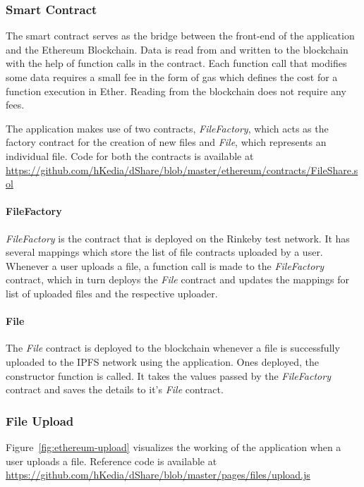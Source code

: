 \subsubsection{Smart Contract}
The smart contract serves as the bridge between the front-end of the application and the Ethereum Blockchain. Data is read from and written to the blockchain with the help of function calls in the contract. Each function call that modifies some data requires a small fee in the form of gas\cite{se:answer:1} which defines the cost for a function execution in Ether. Reading from the blockchain does not require any fees.

The application makes use of two contracts, \textit{FileFactory}, which acts as the factory contract for the creation of new files and \textit{File}, which represents an individual file. Code for both the contracts is available at \url{https://github.com/hKedia/dShare/blob/master/ethereum/contracts/FileShare.sol}

\paragraph{FileFactory}
\textit{FileFactory} is the contract that is deployed on the Rinkeby test network. It has several mappings which store the list of file contracts uploaded by a user. Whenever a user uploads a file, a function call is made to the \textit{FileFactory} contract, which in turn deploys the \textit{File} contract and updates the mappings for list of uploaded files and the respective uploader.

\paragraph{File}
The \textit{File} contract is deployed to the blockchain whenever a file is successfully uploaded to the IPFS network using the application. Ones deployed, the constructor function is called. It takes the values passed by the \textit{FileFactory} contract and saves the details to it’s \textit{File} contract.

\subsubsection{File Upload}
Figure~\ref{fig:ethereum-upload} visualizes the working of the application when a user uploads a file. Reference code is available at \url{https://github.com/hKedia/dShare/blob/master/pages/files/upload.js}

